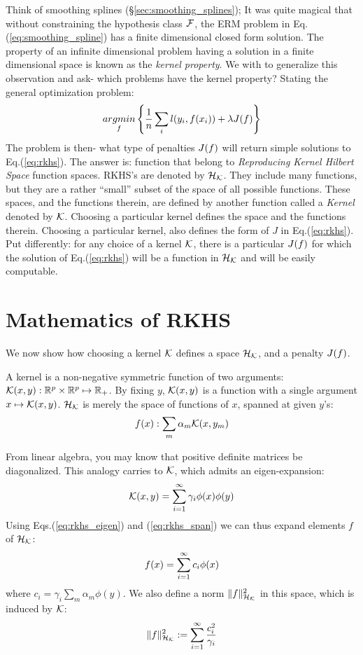 Think of smoothing splines (\S\ref{sec:smoothing_splines});
It was quite magical that without constraining the hypothesis class $\mathcal{F}$, the ERM problem in Eq.(\ref{eq:smoothing_spline}) has a finite dimensional closed form solution.
The property of an infinite dimensional problem having a solution in a finite dimensional space is known as the \emph{kernel property}.
We with to generalize this observation and ask- which problems have the kernel property?
Stating the general optimization problem:
\begin{align}
\label{eq:rkhs}
	\mathop{argmin} _{f}\left\{ \frac{1}{n} \sum_i l(y_i,f(x_i)) + \lambda J(f)  \right\}
\end{align}
The problem is then- what type of penalties $J(f)$ will return simple solutions to Eq.(\ref{eq:rkhs}).
The answer is: function that belong to \emph{Reproducing Kernel Hilbert Space} function spaces. 
RKHS's are denoted by $\mathcal{H}_{\mathcal{K}}$.
They include many functions, but they are a rather ``small'' subset of the space of all possible functions.
These spaces, and the functions therein, are defined by another function called a \emph{Kernel} denoted by $\mathcal{K}$. 
Choosing a particular kernel defines the space and the functions therein.
Choosing a particular kernel, also defines the form of $J$ in Eq.(\ref{eq:rkhs}).
Put differently: for any choice of a kernel $\mathcal{K}$, there is a particular $J(f)$ for which the solution of Eq.(\ref{eq:rkhs}) will be a function in $\mathcal{H}_{\mathcal{K}}$ and will be easily computable. 


\section{Mathematics of RKHS}
We now show how choosing a kernel $\mathcal{K}$ defines a space $\mathcal{H}_{\mathcal{K}}$, and a penalty $J(f)$.

A kernel is a non-negative symmetric function of two arguments: $\mathcal{K}(x,y): \mathbb{R}^p \times \mathbb{R}^p \mapsto \mathbb{R}_+$.
By fixing $y$, $\mathcal{K}(x,y)$ is a function with a single argument $x \mapsto \mathcal{K}(x,y)$.
$\mathcal{H}_{\mathcal{K}}$ is merely the space of functions of $x$, spanned at given $y$'s: 
\begin{align}
\label{eq:rkhs_span}
	f(x):\sum_m \alpha_m \mathcal{K}(x,y_m)
\end{align} 

From linear algebra, you may know that positive definite matrices be diagonalized. 
This analogy carries to $\mathcal{K}$, which admits an eigen-expansion: 
\begin{align}
\label{eq:rkhs_eigen}
	\mathcal{K}(x,y)=\sum_{i=1}^\infty \gamma_i \phi(x) \phi(y)
\end{align}
Using Eqs.(\ref{eq:rkhs_eigen}) and (\ref{eq:rkhs_span}) we can thus expand elements $f$ of $\mathcal{H}_{\mathcal{K}}$: 
\begin{align}
	f(x)=\sum_{i=1}^\infty c_i \phi(x)
\end{align}
where $c_i=\gamma_i \sum_m \alpha_m \phi(y)$.
We also define a norm $\Vert f \Vert_{\mathcal{H}_{\mathcal{K}}}^2$ in this space, which is induced by $\mathcal{K}$:
\begin{align}
\label{eq:rkhs_norm}
	\Vert f \Vert_{\mathcal{H}_{\mathcal{K}}}^2 := \sum_{i=1}^\infty \frac{c_i^2}{\gamma_i}
\end{align}

